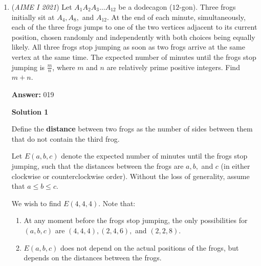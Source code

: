 \begin{enumerate}
 We apply the Law of Cosines to $\triangle AB'D$ and $\triangle CB'D$:
 \begin{align*} B'D^2 = AD^2 + AB'^2 – 2 AD \cdot AB' \cos \theta,\end{align*}

 \[B'D^2 = CD^2 + CB'^2 + 2 CD \cdot CB' \cos \theta,\]
 \[d^2 + b^2 – 2 bd \cos \theta = c^2 + a^2 + 2ac \cos \theta,\]
 \[2(ac + bd) \cos \theta = |d^2 – c^2 + b^2 – a^2|.\]\textbf{vladimir.shelomovskii@gmail.com, vvsss}

 \textbf{Remark} This problem is kind of similar to \href{https://artofproblemsolving.com/wiki/index.php?title=2021\_AIME\_II\_Problems/Problem\_12}{2021 AIME II Problems/Problem 12}.

 


	\item (\textit{AIME I 2021}) Let $A_1A_2A_3\ldots A_{12}$ be a dodecagon ($12$-gon). Three frogs initially sit at $A_4,A_8,$ and $A_{12}$. At the end of each minute, simultaneously, each of the three frogs jumps to one of the two vertices adjacent to its current position, chosen randomly and independently with both choices being equally likely. All three frogs stop jumping as soon as two frogs arrive at the same vertex at the same time. The expected number of minutes until the frogs stop jumping is $\frac mn$, where $m$ and $n$ are relatively prime positive integers. Find $m+n$.


 
 \textbf{Answer: }019



\textbf{Solution 1}

Define the \textbf{distance} between two frogs as the number of sides between them that do not contain the third frog.

 Let $E(a,b,c)$ denote the expected number of minutes until the frogs stop jumping, such that the distances between the frogs are $a,b,$ and $c$ (in either clockwise or counterclockwise order). Without the loss of generality, assume that $a\leq b\leq c.$

 We wish to find $E(4,4,4).$ Note that:

 
            \begin{enumerate} 
        \item At any moment before the frogs stop jumping, the only possibilities for $(a,b,c)$ are $(4,4,4),(2,4,6),$ and $(2,2,8).$

        \item $E(a,b,c)$ does not depend on the actual positions of the frogs, but depends on the distances between the frogs.


\end{enumerate}
\end{enumerate}
